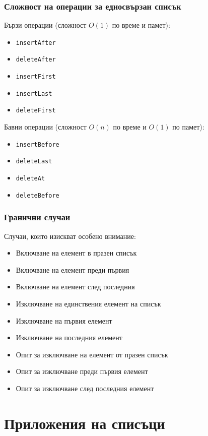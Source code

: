 \documentclass[alsotrans,beameroptions={aspectratio=169}]{beamerswitch}
\begin{document}
\begin{frame}
  \frametitle{Сложност на операции за едносвързан списък}
  Бързи операции (сложност $O(1)$ по време и памет):
  \begin{itemize}
  \item \tt{insertAfter}
  \item \tt{deleteAfter}
  \item \tt{insertFirst}
  \item \tt{insertLast}
  \item \tt{deleteFirst}
  \end{itemize}
  \pause
  Бавни операции (сложност $O(n)$ по време и $O(1)$ по памет):
  \begin{itemize}
  \item \tt{insertBefore}
  \item \tt{deleteLast}
  \item \tt{deleteAt}
  \item \tt{deleteBefore}
  \end{itemize}
\end{frame}

\begin{frame}
  \frametitle{Гранични случаи}
  Случаи, които изискват особено внимание:
  \begin{itemize}[<+->]
  \item Включване на елемент в празен списък
  \item Включване на елемент преди първия
  \item Включване на елемент след последния
  \item Изключване на единствения елемент на списък
  \item Изключване на първия елемент
  \item Изключване на последния елемент
  \item Опит за изключване на елемент от празен списък
  \item Опит за изключване преди първия елемент
  \item Опит за изключване след последния елемент
  \end{itemize}
\end{frame}

\section{Приложения на списъци}
\end{document}
